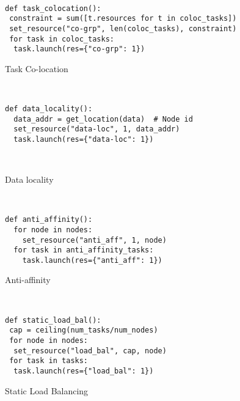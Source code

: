 \newcommand\colmult{0.23}
\begin{figure*}[t]
~
~
\begin{subfigure}[b]{\colmult \textwidth}
  \centering
  \begin{verbatim}
def task_colocation():
 constraint = sum([t.resources for t in coloc_tasks])
 set_resource("co-grp", len(coloc_tasks), constraint)
 for task in coloc_tasks:
  task.launch(res={"co-grp": 1})
  \end{verbatim}
  \caption{Task Co-location}
  \label{fig:policycode:taskcoloc}
\end{subfigure}
~
~
\begin{subfigure}[b]{\colmult\textwidth}
  \centering
  \begin{verbatim}
def data_locality():
  data_addr = get_location(data)  # Node id
  set_resource("data-loc", 1, data_addr)
  task.launch(res={"data-loc": 1})
  
  
  \end{verbatim}
  \caption{Data locality}
  \label{fig:policycode:datalocality}
\end{subfigure}
~
~
\begin{subfigure}[b]{\colmult\textwidth}
  \centering
  \begin{verbatim}
def anti_affinity():
  for node in nodes:
    set_resource("anti_aff", 1, node)
  for task in anti_affinity_tasks:
    task.launch(res={"anti_aff": 1})

  \end{verbatim}
  \caption{Anti-affinity}
  \label{fig:policycode:antiaff}
\end{subfigure}
~
~
\begin{subfigure}[b]{\colmult\textwidth}
  \centering
  \begin{verbatim}
def static_load_bal():
 cap = ceiling(num_tasks/num_nodes)
 for node in nodes:
  set_resource("load_bal", cap, node)
 for task in tasks:
  task.launch(res={"load_bal": 1})
  \end{verbatim}
  \caption{Static Load Balancing}
  \label{fig:policycode:staticloadbal}
\end{subfigure}


\end{figure*}
